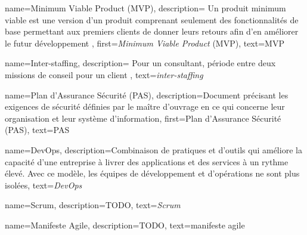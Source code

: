 {
    name={Minimum Viable Product (\textsc{MVP})},
    description={
    Un produit minimum viable est une version d'un produit comprenant seulement des fonctionnalités de base permettant aux premiers clients de donner leurs retours afin d'en améliorer le futur développement
    },
    first={\textit{Minimum Viable Product} (\textsc{MVP})},
    text={\textsc{MVP}}
}

{
    name={Inter-staffing},
    description={
    Pour un consultant, période entre deux missions de conseil pour un client
    },
    text={\textit{inter-staffing}}
}

{
    name={Plan d’Assurance Sécurité (PAS)},
    description={Document précisant les exigences de sécurité définies par le maître d’ouvrage en ce qui concerne leur organisation et leur système d’information},
    first={Plan d’Assurance Sécurité (\textsc{PAS})},
    text={\textsc{PAS}}
}

{
    name={DevOps},
    description={Combinaison de pratiques et d'outils qui améliore la capacité d'une entreprise à livrer des applications et des services à un rythme élevé.
    Avec ce modèle, les équipes de développement et d'opérations ne sont plus isolées},
    text={\textit{DevOps}}
}

{
    name={Scrum},
    description={TODO},
    text={\textit{Scrum}}
}

{
    name={Manifeste Agile},
    description={TODO},
    text={manifeste agile}
}